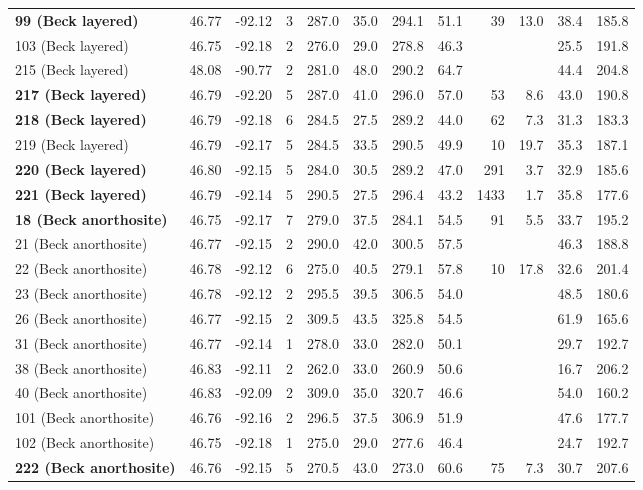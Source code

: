 \documentclass[11pt,letterpaper]{article}
\begin{document}
\begin{table}[h!]
\begin{tabular}{|l|r|r|r|r|r|r|r|r|r|r|r|}
\textbf{99 (Beck layered)	}	&	46.77	&	-92.12	&	3	&	287.0	&	35.0	&	294.1	&	51.1	&	39	&	13.0	&	38.4	&	185.8	\\
	103 (Beck layered)		&	46.75	&	-92.18	&	2	&	276.0	&	29.0	&	278.8	&	46.3	&		&		&	25.5	&	191.8	\\
	215 (Beck layered)		&	48.08	&	-90.77	&	2	&	281.0	&	48.0	&	290.2	&	64.7	&		&		&	44.4	&	204.8	\\
\textbf{217 (Beck layered)	}	&	46.79	&	-92.20	&	5	&	287.0	&	41.0	&	296.0	&	57.0	&	53	&	8.6	&	43.0	&	190.8	\\
\textbf{218 (Beck layered)	}	&	46.79	&	-92.18	&	6	&	284.5	&	27.5	&	289.2	&	44.0	&	62	&	7.3	&	31.3	&	183.3	\\
	219 (Beck layered)		&	46.79	&	-92.17	&	5	&	284.5	&	33.5	&	290.5	&	49.9	&	10	&	19.7	&	35.3	&	187.1	\\
\textbf{220 (Beck layered)	}	&	46.80	&	-92.15	&	5	&	284.0	&	30.5	&	289.2	&	47.0	&	291	&	3.7	&	32.9	&	185.6	\\
\textbf{221 (Beck layered)	}	&	46.79	&	-92.14	&	5	&	290.5	&	27.5	&	296.4	&	43.2	&	1433	&	1.7	&	35.8	&	177.6	\\
\textbf{18 (Beck anorthosite)	}	&	46.75	&	-92.17	&	7	&	279.0	&	37.5	&	284.1	&	54.5	&	91	&	5.5	&	33.7	&	195.2	\\
	21 (Beck anorthosite)		&	46.77	&	-92.15	&	2	&	290.0	&	42.0	&	300.5	&	57.5	&		&		&	46.3	&	188.8	\\
	22 (Beck anorthosite)		&	46.78	&	-92.12	&	6	&	275.0	&	40.5	&	279.1	&	57.8	&	10	&	17.8	&	32.6	&	201.4	\\
	23 (Beck anorthosite)		&	46.78	&	-92.12	&	2	&	295.5	&	39.5	&	306.5	&	54.0	&		&		&	48.5	&	180.6	\\
	26 (Beck anorthosite)		&	46.77	&	-92.15	&	2	&	309.5	&	43.5	&	325.8	&	54.5	&		&		&	61.9	&	165.6	\\
	31 (Beck anorthosite)		&	46.77	&	-92.14	&	1	&	278.0	&	33.0	&	282.0	&	50.1	&		&		&	29.7	&	192.7	\\
	38 (Beck anorthosite)		&	46.83	&	-92.11	&	2	&	262.0	&	33.0	&	260.9	&	50.6	&		&		&	16.7	&	206.2	\\
	40 (Beck anorthosite)		&	46.83	&	-92.09	&	2	&	309.0	&	35.0	&	320.7	&	46.6	&		&		&	54.0	&	160.2	\\
	101 (Beck anorthosite)		&	46.76	&	-92.16	&	2	&	296.5	&	37.5	&	306.9	&	51.9	&		&		&	47.6	&	177.7	\\
	102 (Beck anorthosite)		&	46.75	&	-92.18	&	1	&	275.0	&	29.0	&	277.6	&	46.4	&		&		&	24.7	&	192.7	\\
\textbf{222 (Beck anorthosite)	}	&	46.76	&	-92.15	&	5	&	270.5	&	43.0	&	273.0	&	60.6	&	75	&	7.3	&	30.7	&	207.6	\\
\hline
\end{tabular}


\end{table}
\end{document}
